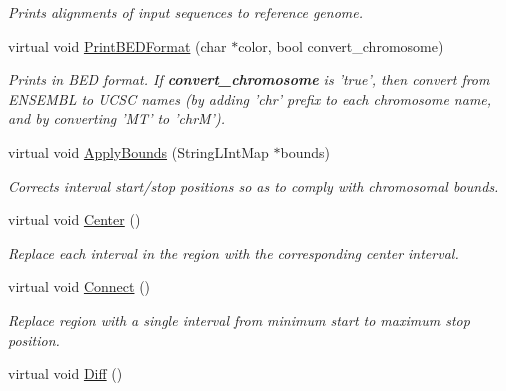 \begin{CompactItemize}
\begin{CompactList}\small\item\em Prints alignments of input sequences to reference genome. \item\end{CompactList}\item 
\hypertarget{classGenomicRegion_405010d9256a3c08c53adee98133cb62}{
virtual void \hyperlink{classGenomicRegion_405010d9256a3c08c53adee98133cb62}{PrintBEDFormat} (char $\ast$color, bool convert\_\-chromosome)}
\label{classGenomicRegion_405010d9256a3c08c53adee98133cb62}

\begin{CompactList}\small\item\em Prints in BED format. If {\bf convert\_\-chromosome} is 'true', then convert from ENSEMBL to UCSC names (by adding 'chr' prefix to each chromosome name, and by converting 'MT' to 'chrM'). \item\end{CompactList}\item 
\hypertarget{classGenomicRegion_71367cf4a117918f43a71a5295839733}{
virtual void \hyperlink{classGenomicRegion_71367cf4a117918f43a71a5295839733}{ApplyBounds} (StringLIntMap $\ast$bounds)}
\label{classGenomicRegion_71367cf4a117918f43a71a5295839733}

\begin{CompactList}\small\item\em Corrects interval start/stop positions so as to comply with chromosomal bounds. \item\end{CompactList}\item 
\hypertarget{classGenomicRegion_1e9a85a086afbe2608411450c9a4c5e6}{
virtual void \hyperlink{classGenomicRegion_1e9a85a086afbe2608411450c9a4c5e6}{Center} ()}
\label{classGenomicRegion_1e9a85a086afbe2608411450c9a4c5e6}

\begin{CompactList}\small\item\em Replace each interval in the region with the corresponding center interval. \item\end{CompactList}\item 
\hypertarget{classGenomicRegion_c2c426782bd7c0d302b7a77bb1ff047f}{
virtual void \hyperlink{classGenomicRegion_c2c426782bd7c0d302b7a77bb1ff047f}{Connect} ()}
\label{classGenomicRegion_c2c426782bd7c0d302b7a77bb1ff047f}

\begin{CompactList}\small\item\em Replace region with a single interval from minimum start to maximum stop position. \item\end{CompactList}\item 
\hypertarget{classGenomicRegion_869de97ecf059355fe5a5b572b5c2575}{
virtual void \hyperlink{classGenomicRegion_869de97ecf059355fe5a5b572b5c2575}{Diff} ()}
\label{classGenomicRegion_869de97ecf059355fe5a5b572b5c2575}


\end{CompactItemize}
